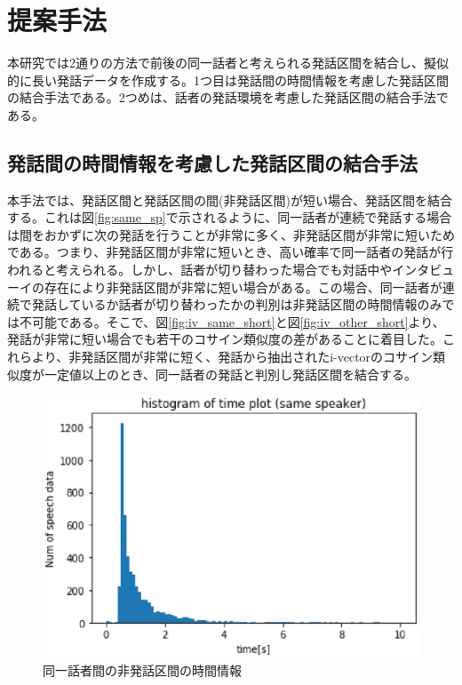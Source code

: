 \chapter{提案手法}
\label{chapter:prob_method}
本研究では2通りの方法で前後の同一話者と考えられる発話区間を結合し、擬似的に長い発話データを作成する。1つ目は発話間の時間情報を考慮した発話区間の結合手法である。2つめは、話者の発話環境を考慮した発話区間の結合手法である。

\section{発話間の時間情報を考慮した発話区間の結合手法}
本手法では、発話区間と発話区間の間(非発話区間)が短い場合、発話区間を結合する。これは図\ref{fig:same_sp}で示されるように、同一話者が連続で発話する場合は間をおかずに次の発話を行うことが非常に多く、非発話区間が非常に短いためである。つまり、非発話区間が非常に短いとき、高い確率で同一話者の発話が行われると考えられる。しかし、話者が切り替わった場合でも対話中やインタビューイの存在により非発話区間が非常に短い場合がある。この場合、同一話者が連続で発話しているか話者が切り替わったかの判別は非発話区間の時間情報のみでは不可能である。そこで、図\ref{fig:iv_same_short}と図\ref{fig:iv_other_short}より、発話が非常に短い場合でも若干のコサイン類似度の差があることに着目した。これらより、非発話区間が非常に短く、発話から抽出されたi-vectorのコサイン類似度が一定値以上のとき、同一話者の発話と判別し発話区間を結合する。

\begin{figure}[htb]
  \begin{center}
    \includegraphics{./figure/same_sp.eps}
  \end{center}
  \caption{同一話者間の非発話区間の時間情報 \label{fig:flow_prob1}}
\end{figure}


